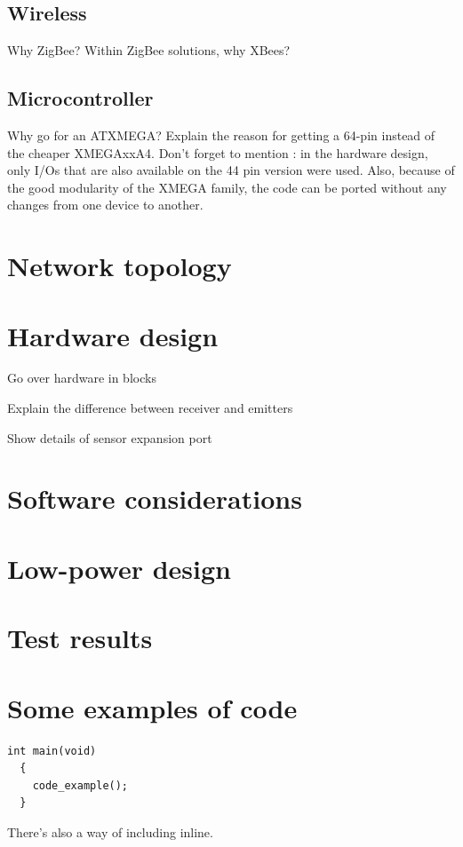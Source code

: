 \subsection{Wireless}
Why ZigBee? Within ZigBee solutions, why XBees?

\subsection{Microcontroller}
Why go for an ATXMEGA?
Explain the reason for getting a 64-pin instead of the cheaper XMEGAxxA4.
Don't forget to mention : in the hardware design, only I/Os that are also
available on the 44 pin version were used. Also, because of the good modularity
of the XMEGA family, the code can be ported without any changes from one device
to another.

\section{Network topology}

\section{Hardware design}

Go over hardware in blocks

Explain the difference between receiver and emitters

Show details of sensor expansion port

\section{Software considerations}

\section{Low-power design}

\section{Test results}

\section{Some examples of code}
\begin{lstlisting}[style=avr-c]
  int main(void)
  {
    code_example();
  }
\end{lstlisting}

There's also a way of including  inline.


